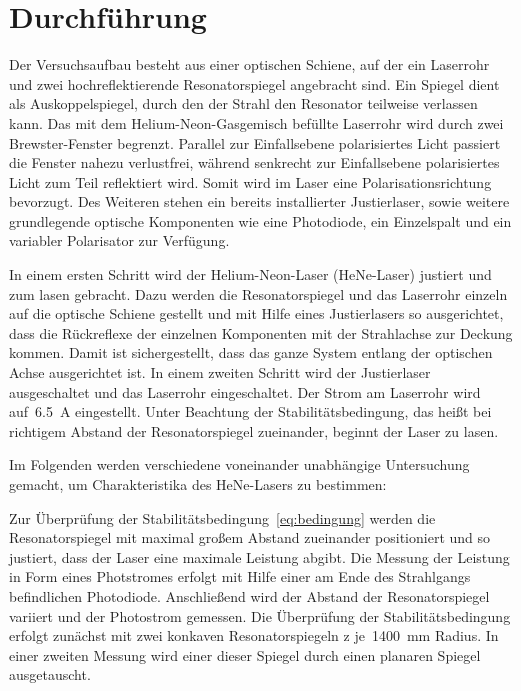 \section{Durchführung}
\label{sec:durchführung}

Der Versuchsaufbau besteht aus einer optischen Schiene, auf der ein Laserrohr
und zwei hochreflektierende Resonatorspiegel angebracht sind. Ein Spiegel dient
als Auskoppelspiegel, durch den der Strahl den Resonator teilweise
verlassen kann. Das mit dem Helium-Neon-Gasgemisch befüllte Laserrohr wird
durch zwei Brewster-Fenster begrenzt. Parallel zur Einfallsebene polarisiertes
Licht passiert die Fenster nahezu verlustfrei, während senkrecht zur
Einfallsebene polarisiertes Licht zum Teil reflektiert wird. Somit wird im Laser
eine Polarisationsrichtung bevorzugt. Des Weiteren stehen ein bereits
installierter Justierlaser, sowie weitere grundlegende optische Komponenten wie
eine Photodiode, ein Einzelspalt und ein variabler Polarisator zur Verfügung.

In einem ersten Schritt wird der Helium-Neon-Laser (HeNe-Laser) justiert und zum
lasen gebracht. Dazu werden die Resonatorspiegel und das Laserrohr einzeln auf
die optische Schiene gestellt und mit Hilfe eines Justierlasers so ausgerichtet,
dass die Rückreflexe der einzelnen Komponenten mit der Strahlachse zur Deckung
kommen. Damit ist sichergestellt, dass das ganze System entlang der optischen
Achse ausgerichtet ist. In einem zweiten Schritt wird der Justierlaser
ausgeschaltet und das Laserrohr eingeschaltet. Der Strom am Laserrohr wird
auf~\SI{6.5}{\ampere} eingestellt. Unter Beachtung der Stabilitätsbedingung,
das heißt bei richtigem Abstand der Resonatorspiegel zueinander, beginnt der
Laser zu lasen.

Im Folgenden werden verschiedene voneinander unabhängige Untersuchung gemacht,
um Charakteristika des HeNe-Lasers zu bestimmen:

Zur Überprüfung der Stabilitätsbedingung~\eqref{eq:bedingung} werden die
Resonatorspiegel mit maximal großem Abstand zueinander positioniert und so
justiert, dass der Laser eine maximale Leistung abgibt. Die Messung der
Leistung in Form eines Photstromes erfolgt mit Hilfe einer am Ende des
Strahlgangs befindlichen Photodiode. Anschließend wird der Abstand der
Resonatorspiegel variiert und der Photostrom gemessen. Die Überprüfung der
Stabilitätsbedingung erfolgt zunächst mit zwei konkaven Resonatorspiegeln z
je~\SI{1400}{\milli\metre} Radius. In einer zweiten Messung wird einer dieser
Spiegel durch einen planaren Spiegel ausgetauscht.

